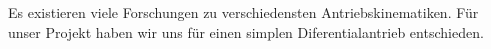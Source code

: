 \begin{flushleft}
Es existieren viele Forschungen zu verschiedensten Antriebskinematiken.
Für unser Projekt haben wir uns für einen simplen Diferentialantrieb entschieden. 
\end{flushleft}